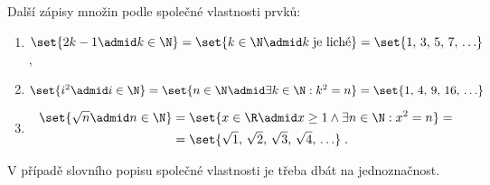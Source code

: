 \begin{example} Další zápisy množin podle společné vlastnosti prvků:
    \begin{enumerate}[label=(\roman*)]
        \item $\set{2k-1 \admid k \in \N}=\set{k\in\N \admid k\;\text{je liché}}=\set{1,\,3,\,5,\,7,\,\ldots}$ ,
        \item $\set{i^2 \admid i \in \N}=\set{n \in \N \admid \exists k\in\N: k^2=n}=\set{1,\,4,\,9,\,16,\,\ldots}$
        \item 
        \begin{align*}
            \set{\sqrt{n} \admid n \in \N}&=\set{x \in \R \admid x \geq 1 \land \exists n\in\N: x^2=n}=\\
            &=\set{\sqrt{1},\,\sqrt{2},\,\sqrt{3},\,\sqrt{4},\,\ldots}\; .
        \end{align*}
    \end{enumerate}
\end{example}
\begin{remark}
    V případě slovního popisu společné vlastnosti je třeba dbát na jednoznačnost.
\end{remark}

